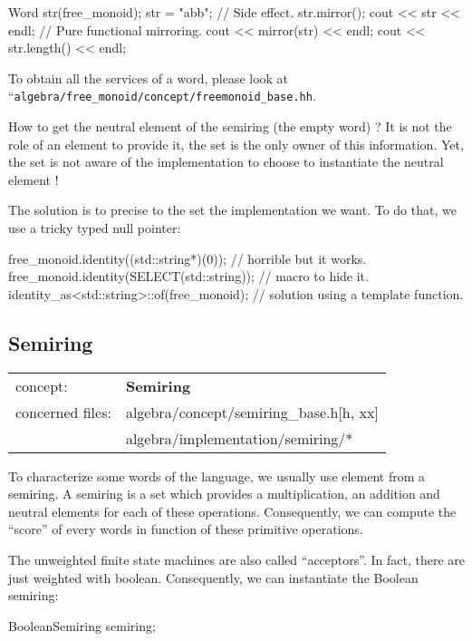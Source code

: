 \documentclass{article}
\begin{document}
\begin{code}
  Word str(free_monoid);
  str = "abb";
  // Side effect.
  str.mirror();
  cout << str << endl;
  // Pure functional mirroring.
  cout << mirror(str) << endl;
  cout << str.length() << endl;
\end{code}

To obtain all the services of a word, please look at
``\verb!algebra/free_monoid/concept/freemonoid_base.hh!.

How to get the neutral element of the semiring (the empty word) ? It
is not the role of an element to provide it, the set is the only owner
of this information. Yet, the set is not aware of the implementation
to choose to instantiate the neutral element ! 

The solution is to precise to the set the implementation we want. To
do that, we use a tricky typed null pointer:

\begin{code}
free_monoid.identity((std::string*)(0));   // horrible but it works.
free_monoid.identity(SELECT(std::string)); // macro to hide it.
identity_as<std::string>::of(free_monoid); // solution using a template function.
\end{code}

\subsection{Semiring}

\begin{tabular}%
{ll}
\hline 
concept: & \textbf{Semiring}  \\
concerned files: & algebra/concept/semiring\_base.h[h, xx] \\
                 & algebra/implementation/semiring/* \\
\hline 
\end{tabular}

To characterize some words of the language, we usually use element
from a semiring. A semiring is a set which provides a multiplication,
an addition and neutral elements for each of these operations.
Consequently, we can compute the ``score'' of every words in function of
these primitive operations.

The unweighted finite state machines are also called ``acceptors''. In
fact, there are just weighted with boolean. Consequently, we can
instantiate the Boolean semiring:

\begin{code}
BooleanSemiring semiring;
\end{code}
\end{document}

